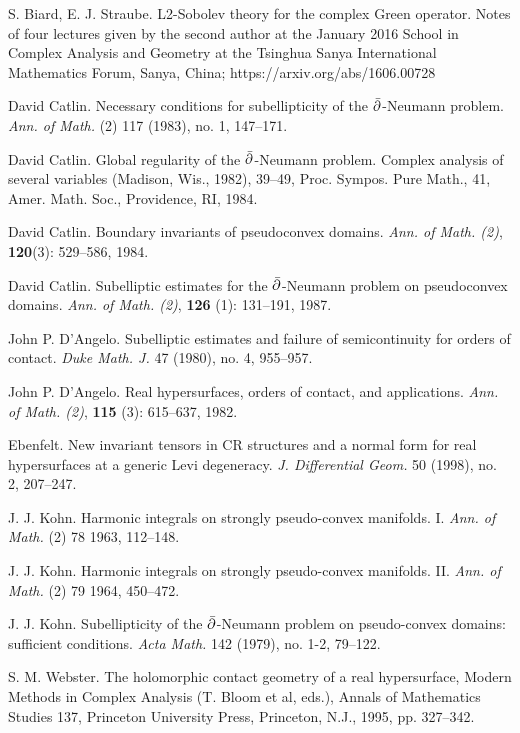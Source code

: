 \documentclass[12pt]{amsart}
\begin{document}
\begin{thebibliography}{BER96}

S. Biard, E. J. Straube.
L2-Sobolev theory for the complex Green operator. 
Notes of four lectures given by the second author at the January 2016 School in Complex Analysis and Geometry at the Tsinghua Sanya International Mathematics Forum, Sanya, China;
{\sf https://arxiv.org/abs/1606.00728}

  David Catlin. Necessary conditions for subellipticity of the $\bar{\partial}$-Neumann problem. {\em Ann. of Math.} (2) 117 (1983), no. 1, 147--171.

  David Catlin. Global regularity of the $\bar{\partial}$-Neumann problem. Complex analysis of several variables (Madison, Wis., 1982), 39--49, Proc. Sympos. Pure Math., 41, Amer. Math. Soc., Providence, RI, 1984.

  David Catlin. Boundary invariants of pseudoconvex domains. {\em Ann. of Math. (2)}, {\bf 120}(3):  529--586, 1984.

 David Catlin. Subelliptic estimates for the $\bar{\partial}$-Neumann problem on pseudoconvex domains. {\em Ann. of Math. (2)}, {\bf 126} (1): 131--191, 1987.

  John P. D'Angelo.
Subelliptic estimates and failure of semicontinuity for orders of contact. 
{\em Duke Math. J.} 47 (1980), no. 4, 955--957.

 John P. D'Angelo. Real hypersurfaces, orders of contact, and applications. 
{\em Ann. of Math. (2)}, {\bf 115} (3): 615--637, 1982.

 Ebenfelt. New invariant tensors in CR structures and a normal form for real hypersurfaces at a generic Levi degeneracy. {\em J. Differential Geom.} 50 (1998), no. 2, 207--247. 

 J. J. Kohn. Harmonic integrals on strongly pseudo-convex manifolds. I. {\em Ann. of Math.} (2) 78 1963, 112--148.

 J. J. Kohn. Harmonic integrals on strongly pseudo-convex manifolds. II. {\em Ann. of Math.} (2) 79 1964, 450--472.

 J. J. Kohn. Subellipticity of the $\bar{\partial}$-Neumann problem on pseudo-convex domains: sufficient conditions. {\em Acta Math.} 142 (1979), no. 1-2, 79--122.


 S. M. Webster. The holomorphic contact geometry of a real hypersurface, Modern Methods in Complex Analysis (T. Bloom et al, eds.), Annals of Mathematics Studies 137, Princeton University Press, Princeton, N.J., 1995, pp. 327--342.

\end{thebibliography}
\end{document}
